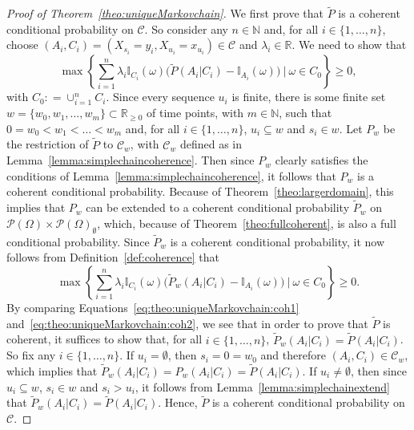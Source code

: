 \documentclass[10pt,a4paper]{paper}
\theoremstyle{definition}
\newcommand{\nats}{\mathbb{N}}
\newcommand{\reals}{\mathbb{R}}
\newcommand{\paths}{\Omega}
\newcommand{\power}{\mathcal{P}(\paths)}
\newcommand{\nonemptypower}{\power_{\emptyset}}
\newcommand{\ind}[1]{\mathbb{I}_{#1}}
\newcommand{\coloneqq}{:\!=}
\begin{document}
\begin{proof}[Proof of Theorem~\ref{theo:uniqueMarkovchain}]
We first prove that $\tilde{P}$ is a coherent conditional probability on $\mathcal{C}$. So consider any $n\in\nats$ and, for all $i\in\{1,\dots,n\}$, choose $(A_i,C_i)=(X_{s_i}=y_i,X_{u_i}=x_{u_i})\in\mathcal{C}$ and $\lambda_i\in\reals$. We need to show that
\begin{equation}\label{eq:theo:uniqueMarkovchain:coh1}
\max\left\{\sum_{i=1}^n\lambda_i\ind{C_i}(\omega)\bigl(\tilde{P}(A_i\vert C_i)-\ind{A_i}(\omega)\bigr)~\Bigg\vert~\omega\in C_0\right\}\geq0,
\end{equation}
with $C_0\coloneqq\cup_{i=1}^nC_i$.
Since every sequence $u_i$ is finite, there is some finite set $w=\{w_0,w_1,\dots,w_m\}\subset\reals_{\geq0}$ of time points, with $m\in\nats$, such that $0=w_0<w_1<\dots<w_m$ and, for all $i\in\{1,\dots,n\}$, $u_i\subseteq w$ and $s_i\in w$.
Let $P_w$ be the restriction of $\tilde{P}$ to $\mathcal{C}_w$, with $\mathcal{C}_w$ defined as in Lemma~\ref{lemma:simplechaincoherence}. Then since $P_w$ clearly satisfies the conditions of Lemma~\ref{lemma:simplechaincoherence}, it follows that $P_w$ is a coherent conditional probability. Because of Theorem~\ref{theo:largerdomain}, this implies that $P_w$ can be extended to a coherent conditional probability $\tilde{P}_w$ on $\power\times\nonemptypower$, which, because of Theorem~\ref{theo:fullcoherent}, is also a full conditional probability. Since $\tilde{P}_w$ is a coherent conditional probability, it now follows from Definition~\ref{def:coherence} that
\begin{equation}\label{eq:theo:uniqueMarkovchain:coh2}
\max\left\{\sum_{i=1}^n\lambda_i\ind{C_i}(\omega)\bigl(\tilde{P}_w(A_i\vert C_i)-\ind{A_i}(\omega)\bigr)~\Bigg\vert~\omega\in C_0\right\}\geq0.
\end{equation}
By comparing Equations~\eqref{eq:theo:uniqueMarkovchain:coh1} and~\eqref{eq:theo:uniqueMarkovchain:coh2}, we see that in order to prove that $\tilde{P}$ is coherent, it suffices to show that, for all $i\in\{1,\dots,n\}$, $\tilde{P}_w(A_i\vert C_i)=\tilde{P}(A_i\vert C_i)$. So fix any $i\in\{1,\dots,n\}$. If $u_i=\emptyset$, then $s_i=0=w_0$ and therefore $(A_i,C_i)\in\mathcal{C}_w$, which implies that $\tilde{P}_w(A_i\vert C_i)=P_w(A_i\vert C_i)=\tilde{P}(A_i\vert C_i)$. If $u_i\neq\emptyset$, then since $u_i\subseteq w$, $s_i\in w$ and $s_i>u_i$, it follows from Lemma~\ref{lemma:simplechainextend} that $\tilde{P}_w(A_i\vert C_i)=\tilde{P}(A_i\vert C_i)$. Hence, $\tilde{P}$ is a coherent conditional probability on $\mathcal{C}$.




\end{proof}
\end{document}
